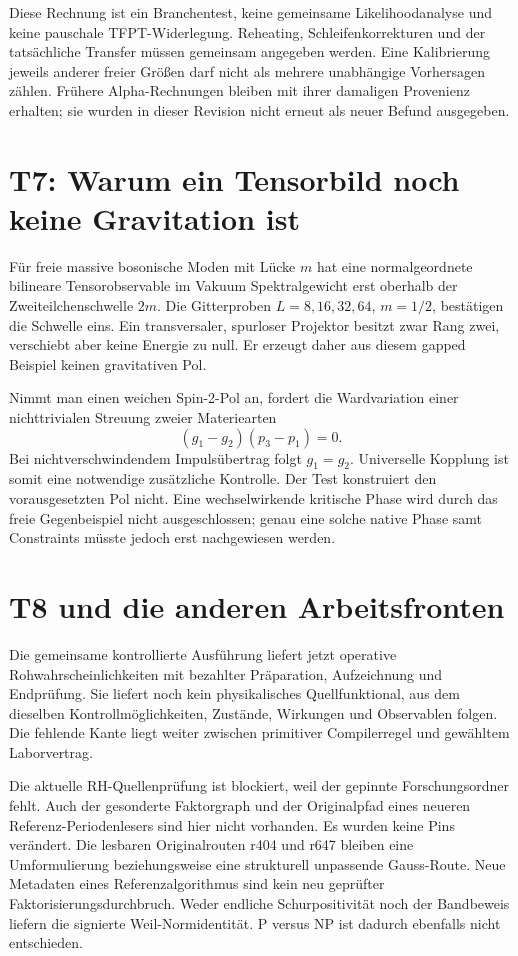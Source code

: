 Diese Rechnung ist ein Branchentest, keine gemeinsame Likelihoodanalyse und keine pauschale TFPT-Widerlegung. Reheating, Schleifenkorrekturen und der tatsächliche Transfer müssen gemeinsam angegeben werden. Eine Kalibrierung jeweils anderer freier Größen darf nicht als mehrere unabhängige Vorhersagen zählen. Frühere Alpha-Rechnungen bleiben mit ihrer damaligen Provenienz erhalten; sie wurden in dieser Revision nicht erneut als neuer Befund ausgegeben.

\section{T7: Warum ein Tensorbild noch keine Gravitation ist}
Für freie massive bosonische Moden mit Lücke $m$ hat eine normalgeordnete bilineare Tensorobservable im Vakuum Spektralgewicht erst oberhalb der Zweiteilchenschwelle $2m$. Die Gitterproben $L=8,16,32,64$, $m=1/2$, bestätigen die Schwelle eins. Ein transversaler, spurloser Projektor besitzt zwar Rang zwei, verschiebt aber keine Energie zu null. Er erzeugt daher aus diesem gapped Beispiel keinen gravitativen Pol.

Nimmt man einen weichen Spin-2-Pol an, fordert die Wardvariation einer nichttrivialen Streuung zweier Materiearten
\begin{equation}
(g_1-g_2)(p_3-p_1)=0.
\end{equation}
Bei nichtverschwindendem Impulsübertrag folgt $g_1=g_2$. Universelle Kopplung ist somit eine notwendige zusätzliche Kontrolle. Der Test konstruiert den vorausgesetzten Pol nicht. Eine wechselwirkende kritische Phase wird durch das freie Gegenbeispiel nicht ausgeschlossen; genau eine solche native Phase samt Constraints müsste jedoch erst nachgewiesen werden.

\section{T8 und die anderen Arbeitsfronten}
Die gemeinsame kontrollierte Ausführung liefert jetzt operative Rohwahrscheinlichkeiten mit bezahlter Präparation, Aufzeichnung und Endprüfung. Sie liefert noch kein physikalisches Quellfunktional, aus dem dieselben Kontrollmöglichkeiten, Zustände, Wirkungen und Observablen folgen. Die fehlende Kante liegt weiter zwischen primitiver Compilerregel und gewähltem Laborvertrag.

Die aktuelle RH-Quellenprüfung ist blockiert, weil der gepinnte Forschungsordner fehlt. Auch der gesonderte Faktorgraph und der Originalpfad eines neueren Referenz-Periodenlesers sind hier nicht vorhanden. Es wurden keine Pins verändert. Die lesbaren Originalrouten r404 und r647 bleiben eine Umformulierung beziehungsweise eine strukturell unpassende Gauss-Route. Neue Metadaten eines Referenzalgorithmus sind kein neu geprüfter Faktorisierungsdurchbruch. Weder endliche Schurpositivität noch der Bandbeweis liefern die signierte Weil-Normidentität. P versus NP ist dadurch ebenfalls nicht entschieden.

